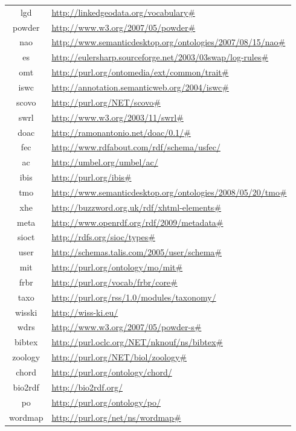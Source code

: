 \documentclass{article}
\begin{document}
\begin{longtable}{ c | p{8cm} }
lgd & \url{http://linkedgeodata.org/vocabulary#} \\
powder & \url{http://www.w3.org/2007/05/powder#} \\
nao & \url{http://www.semanticdesktop.org/ontologies/2007/08/15/nao#} \\
es & \url{http://eulersharp.sourceforge.net/2003/03swap/log-rules#} \\
omt & \url{http://purl.org/ontomedia/ext/common/trait#} \\
iswc & \url{http://annotation.semanticweb.org/2004/iswc#} \\
scovo & \url{http://purl.org/NET/scovo#} \\
swrl & \url{http://www.w3.org/2003/11/swrl#} \\
doac & \url{http://ramonantonio.net/doac/0.1/#} \\
fec & \url{http://www.rdfabout.com/rdf/schema/usfec/} \\
ac & \url{http://umbel.org/umbel/ac/} \\
ibis & \url{http://purl.org/ibis#} \\
tmo & \url{http://www.semanticdesktop.org/ontologies/2008/05/20/tmo#} \\
xhe & \url{http://buzzword.org.uk/rdf/xhtml-elements#} \\
meta & \url{http://www.openrdf.org/rdf/2009/metadata#} \\
sioct & \url{http://rdfs.org/sioc/types#} \\
user & \url{http://schemas.talis.com/2005/user/schema#} \\
mit & \url{http://purl.org/ontology/mo/mit#} \\
frbr & \url{http://purl.org/vocab/frbr/core#} \\
taxo & \url{http://purl.org/rss/1.0/modules/taxonomy/} \\
wisski & \url{http://wiss-ki.eu/} \\
wdrs & \url{http://www.w3.org/2007/05/powder-s#} \\
bibtex & \url{http://purl.oclc.org/NET/nknouf/ns/bibtex#} \\
zoology & \url{http://purl.org/NET/biol/zoology#} \\
chord & \url{http://purl.org/ontology/chord/} \\
bio2rdf & \url{http://bio2rdf.org/} \\
po & \url{http://purl.org/ontology/po/} \\
wordmap & \url{http://purl.org/net/ns/wordmap#} \\

\end{longtable}
\end{document}
